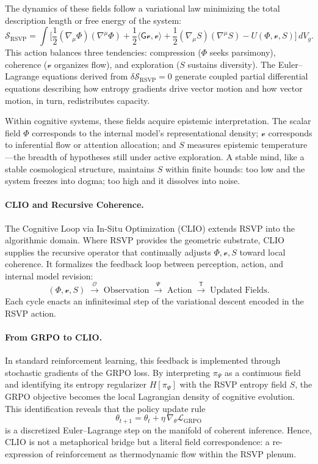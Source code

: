 \documentclass[11pt]{article}
\begin{document}
The dynamics of these fields follow a variational law minimizing the total description length or free energy of the system:
\[
\mathcal{S}_{\mathrm{RSVP}}
=
\int
\big[
\frac{1}{2}(\nabla_\mu\Phi)(\nabla^\mu\Phi)
+\frac{1}{2}\langle \mathsf{G}\mathcal{v},\mathcal{v}\rangle
+\frac{1}{2}(\nabla_\mu S)(\nabla^\mu S)
-U(\Phi,\mathcal{v},S)
\big]\,dV_g.
\]
This action balances three tendencies: compression ($\Phi$ seeks parsimony), coherence ($\mathcal{v}$ organizes flow), and exploration ($S$ sustains diversity). 
The Euler–Lagrange equations derived from $\delta \mathcal{S}_{\mathrm{RSVP}}=0$ generate coupled partial differential equations describing how entropy gradients drive vector motion and how vector motion, in turn, redistributes capacity.

Within cognitive systems, these fields acquire epistemic interpretation. 
The scalar field $\Phi$ corresponds to the internal model’s representational density; $\mathcal{v}$ corresponds to inferential flow or attention allocation; and $S$ measures epistemic temperature—the breadth of hypotheses still under active exploration. 
A stable mind, like a stable cosmological structure, maintains $S$ within finite bounds: too low and the system freezes into dogma; too high and it dissolves into noise.

\paragraph{CLIO and Recursive Coherence.}
The Cognitive Loop via In-Situ Optimization (CLIO) extends RSVP into the algorithmic domain. 
Where RSVP provides the geometric substrate, CLIO supplies the recursive operator that continually adjusts $\Phi,\mathcal{v},S$ toward local coherence. 
It formalizes the feedback loop between perception, action, and internal model revision:
\[
(\Phi,\mathcal{v},S) \;\xrightarrow{\;\mathcal{O}\;}\; \text{Observation} 
\;\xrightarrow{\;\Psi\;}\; \text{Action} 
\;\xrightarrow{\;\mathsf{T}\;}\; \text{Updated Fields}.
\]
Each cycle enacts an infinitesimal step of the variational descent encoded in the RSVP action.

\paragraph{From GRPO to CLIO.}
In standard reinforcement learning, this feedback is implemented through stochastic gradients of the GRPO loss.  
By interpreting $\pi_\Psi$ as a continuous field and identifying its entropy regularizer $H[\pi_\Psi]$ with the RSVP entropy field $S$, the GRPO objective becomes the local Lagrangian density of cognitive evolution.  
This identification reveals that the policy update rule 
\[
\theta_{t+1} = \theta_t + \eta\,\nabla_\theta \mathcal{L}_{\mathrm{GRPO}}
\]
is a discretized Euler–Lagrange step on the manifold of coherent inference.  
Hence, CLIO is not a metaphorical bridge but a literal field correspondence: a re-expression of reinforcement as thermodynamic flow within the RSVP plenum.
\end{document}
